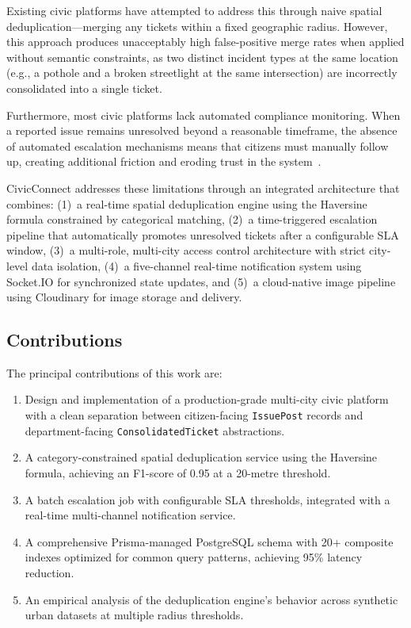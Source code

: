 \documentclass[conference]{IEEEtran}
\begin{document}
Existing civic platforms have attempted to address this through naive spatial deduplication---merging any tickets within a fixed geographic radius. However, this approach produces unacceptably high false-positive merge rates when applied without semantic constraints, as two distinct incident types at the same location (e.g., a pothole and a broken streetlight at the same intersection) are incorrectly consolidated into a single ticket.

Furthermore, most civic platforms lack automated compliance monitoring. When a reported issue remains unresolved beyond a reasonable timeframe, the absence of automated escalation mechanisms means that citizens must manually follow up, creating additional friction and eroding trust in the system~\cite{b7}.

CivicConnect addresses these limitations through an integrated architecture that combines: (1)~a real-time spatial deduplication engine using the Haversine formula constrained by categorical matching, (2)~a time-triggered escalation pipeline that automatically promotes unresolved tickets after a configurable SLA window, (3)~a multi-role, multi-city access control architecture with strict city-level data isolation, (4)~a five-channel real-time notification system using Socket.IO for synchronized state updates, and (5)~a cloud-native image pipeline using Cloudinary for image storage and delivery.

\subsection{Contributions}

The principal contributions of this work are:

\begin{enumerate}
\item Design and implementation of a production-grade multi-city civic platform with a clean separation between citizen-facing \texttt{IssuePost} records and department-facing \texttt{ConsolidatedTicket} abstractions.
\item A category-constrained spatial deduplication service using the Haversine formula, achieving an F1-score of 0.95 at a 20-metre threshold.
\item A batch escalation job with configurable SLA thresholds, integrated with a real-time multi-channel notification service.
\item A comprehensive Prisma-managed PostgreSQL schema with 20+ composite indexes optimized for common query patterns, achieving 95\% latency reduction.
\item An empirical analysis of the deduplication engine's behavior across synthetic urban datasets at multiple radius thresholds.
\end{enumerate}
\end{document}

